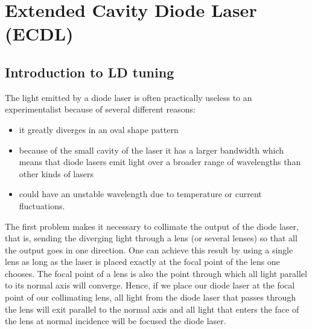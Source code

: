 \chapter{Extended Cavity Diode Laser (ECDL)}\label{ECDL}
	\section{Introduction to LD tuning}

The light emitted by a diode laser is often practically useless to an experimentalist because of several different reasons:
\begin{itemize}
 \item it greatly diverges in an oval shape pattern
 \item because of the small cavity of the laser it has a larger bandwidth which means that diode lasers emit light over a broader range of wavelengths than other kinds of lasers
 \item could have an unstable wavelength due to temperature or current fluctuations.
\end{itemize}

The first problem makes it necessary to collimate the output of the diode laser, that is, sending the diverging light through a lens (or several lenses) so that all the output goes in one direction. One can achieve this result by using a single lens as long as the laser is placed exactly at the focal  point of the lens one chooses. The focal point of a lens is also the point through which all light parallel to its normal axis will converge. Hence, if we place our diode laser at the focal point of our collimating lens, all light from the diode laser that passes through the lens will exit parallel to the normal axis and all light that enters the face of the lens at normal incidence will be focused the diode laser.

